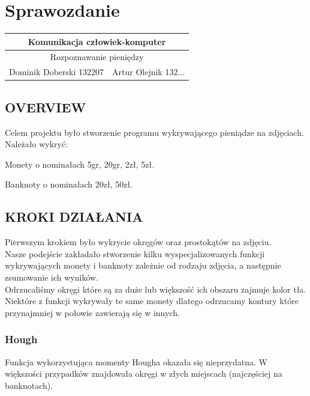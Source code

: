 \documentclass[12pt]{article}
\begin{document}
\section*{Sprawozdanie}

\begin{center}
\begin{table}[]
\begin{tabular}{|c|l|}
\hline
\multicolumn{2}{|c|}{Komunikacja człowiek-komputer}                  \\ \hline
\multicolumn{2}{|c|}{Rozpoznawanie pieniędzy}                        \\ \hline
\multicolumn{1}{|l|}{Dominik Doberski 132207} & Artur Olejnik 132... \\ \hline
\end{tabular}
\end{table}
\end{center}

\subsection*{OVERVIEW}

Celem projektu było stworzenie programu wykrywającego pieniądze na zdjęciach.\\
Należało wykryć:

Monety o nominałach 5gr, 20gr, 2zł, 5zł.

Banknoty o nominałach 20zł, 50zł.
\newpage
\subsection*{KROKI DZIAŁANIA}
Pierwszym krokiem było wykrycie okręgów oraz prostokątów na zdjęciu.
\\Nasze podejście zakładało stworzenie kilku wyspecjalizowanych funkcji wykrywających monety i banknoty zależnie od rodzaju zdjęcia, a następnie zsumowanie ich wyników.\\
Odrzucaliśmy okręgi które są za duże lub większość ich obszaru zajmuje kolor tła.\\
Niektóre z funkcji wykrywały te same monety dlatego odrzucamy kontury które przynajmniej w połowie zawierają się w innych.
\subsubsection*{Hough}
Funkcja wykorzystująca momenty Hougha okazała się nieprzydatna.
W większości przypadków znajdowała okręgi w złych miejscach (najczęściej na banknotach).
\end{document}
